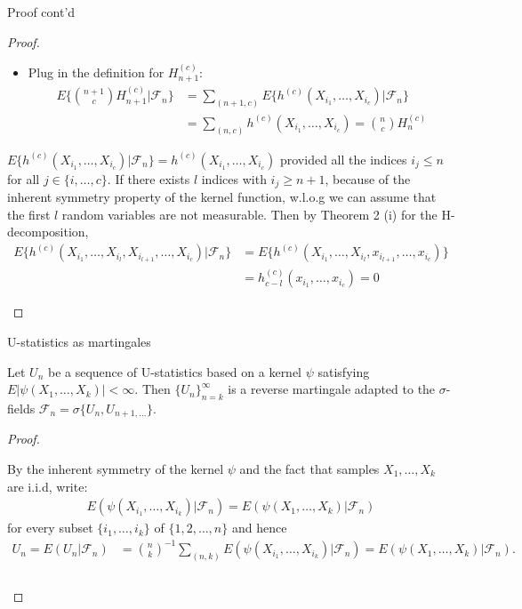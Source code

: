 \documentclass{beamer}
\theoremstyle{definition}
\numberwithin{Def}{section}
\begin{document}
\begin{frame}{Proof cont'd}
\begin{proof}
\begin{fontsize}{7}{12}
\begin{itemize}
    \item Plug in the definition for $H_{n+1}^{(c)}$:
\begin{align*}
E\{{{n+1}\choose c} H_{n+1}^{(c)}|\mathcal{F}_n\}&=
\sum_{(n+1,c)}E\{h^{(c)}(X_{i_1},\dotsc,X_{i_c})|\mathcal{F}_n\}\\
&=\sum_{(n,c)}h^{(c)}(X_{i_1},\dotsc,X_{i_c})={n\choose c}H_n^{(c)}
\end{align*}
\end{itemize}
 $E\{h^{(c)}(X_{i_1},\dotsc,X_{i_c})|\mathcal{F}_n\}=h^{(c)}(X_{i_1},\dotsc,X_{i_c})$ provided all the indices $i_j\le n$ for all $j \in \{i,\dotsc, c\}$. If there exists $l$ indices with $i_j\ge n+1$, because of the inherent symmetry property of the kernel function, w.l.o.g we can assume that the first $l$ random variables are not measurable. Then by Theorem 2 (i) for the H-decomposition,
\begin{align*}
E\{h^{(c)}(X_{i_1},\dotsc,X_{i_l},X_{i_{l+1}},\dotsc, X_{i_c})|\mathcal{F}_n\}&=E\{h^{(c)}(X_{i_1},\dotsc,X_{i_l},x_{i_{l+1}},\dotsc, x_{i_c})\}\\&=h^{(c)}_{c-l}(x_{i_1},\dotsc,x_{i_c})=0
\end{align*}
\end{fontsize}
\end{proof}
\end{frame}

\begin{frame}{U-statistics as martingales}
\begin{theorem}
Let $U_n$ be a sequence of U-statistics based on a kernel $\psi$ satisfying $E|\psi(X_1, \dotsc, X_k)|<\infty$. Then $\{U_n\}_{n=k}^\infty$ is a reverse martingale adapted to the $\sigma$-fields $\mathcal{F}_n=\sigma\{U_n, U_{n+1,\dotsc}\}$.
\end{theorem}
\begin{proof}
\begin{fontsize}{9}{12}
By the inherent symmetry of the kernel $\psi$ and the fact that samples $X_1, \dotsc, X_k$ are i.i.d, write:
\begin{align*}
    E(\psi (X_{i_1}, \dotsc, X_{i_k})|\mathcal{F}_n)=E(\psi (X_1, \dotsc, X_k)|\mathcal{F}_n)
\end{align*}
for every subset $\{i_1, \dotsc, i_k\}$ of $\{1,2,\dotsc,n\}$ and hence 
\begin{align*}
    U_n=E(U_n|\mathcal{F}_n)&={n\choose k}^{-1}\sum_{(n,k)}E(\psi(X_{i_1}, \dotsc,X_{i_k})|\mathcal{F}_n)
    =E(\psi(X_1,\dotsc,X_k)|\mathcal{F}_n).\\
    \\
\end{align*}
\end{fontsize}
\end{proof}
\end{frame}
\end{document}
